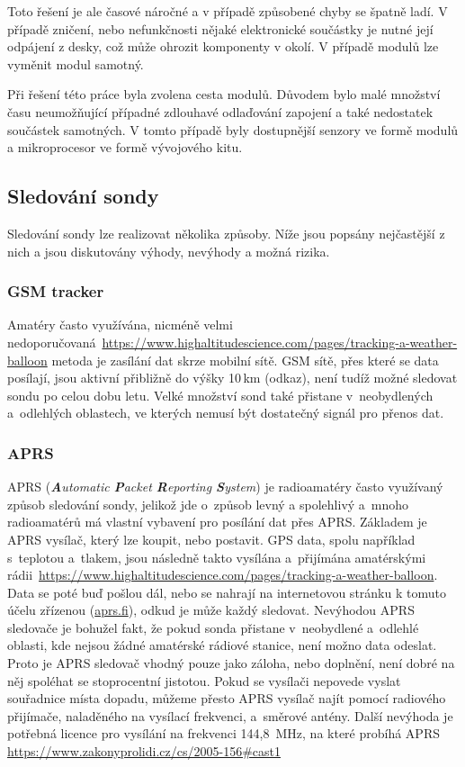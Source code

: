\documentclass[twoside]{ctuthesis}
\theoremstyle{plain}
\theoremstyle{definition}
\theoremstyle{note}
\begin{document}
		Toto řešení je ale časové náročné a v případě způsobené chyby se špatně ladí. V případě zničení, nebo nefunkčnosti nějaké elektronické součástky je nutné její odpájení z desky, což může ohrozit komponenty v okolí. V případě modulů lze vyměnit modul samotný.

		Při řešení této práce byla zvolena cesta modulů. Důvodem bylo malé množství času neumožňující případné zdlouhavé odlaďování zapojení a také nedostatek součástek samotných. V tomto případě byly dostupnější senzory ve formě modulů a mikroprocesor ve formě vývojového kitu. 

		
			\subsection{Sledování sondy}
			Sledování sondy lze realizovat několika způsoby. Níže jsou popsány nejčastější z nich a jsou diskutovány výhody, nevýhody a možná rizika.

				\subsubsection{GSM tracker}
				Amatéry často využívána, nicméně velmi nedoporučovaná~\url{https://www.highaltitudescience.com/pages/tracking-a-weather-balloon} metoda je zasílání dat skrze mobilní sítě. GSM sítě, přes které se data posílají, jsou aktivní přibližně do výšky 10\,km (odkaz), není tudíž možné sledovat sondu po celou dobu letu. Velké množství sond také přistane v~neobydlených a~odlehlých oblastech, ve kterých nemusí být dostatečný signál pro přenos dat.


				\subsubsection{APRS}
				APRS (\textit{\textbf{A}utomatic \textbf{P}acket \textbf{R}eporting \textbf{S}ystem}) je radioamatéry často využívaný způsob sledování sondy, jelikož jde o~způsob levný a spolehlivý a~mnoho radioamatérů má vlastní vybavení pro posílání dat přes APRS. Základem je APRS vysílač, který lze koupit, nebo postavit. GPS data, spolu například s~teplotou a~tlakem, jsou následně takto vysílána a~přijímána amatérskými rádii~\url{https://www.highaltitudescience.com/pages/tracking-a-weather-balloon}. Data se poté buď pošlou dál, nebo se nahrají na internetovou stránku k tomuto účelu zřízenou (\url{aprs.fi}), odkud je může každý sledovat.
				Nevýhodou APRS sledovače je bohužel fakt, že pokud sonda přistane v~neobydlené a~odlehlé oblasti, kde nejsou žádné amatérské rádiové stanice, není možno data odeslat. Proto je APRS sledovač vhodný pouze jako záloha, nebo doplnění, není dobré na něj spoléhat se stoprocentní jistotou. Pokud se vysílači nepovede vyslat souřadnice místa dopadu, můžeme přesto APRS vysílač najít pomocí radiového přijímače, naladěného na vysílací frekvenci, a~směrové antény. Další nevýhoda je potřebná licence pro vysílání na frekvenci 144,8~MHz, na které probíhá APRS \url{https://www.zakonyprolidi.cz/cs/2005-156#cast1}
\end{document}
